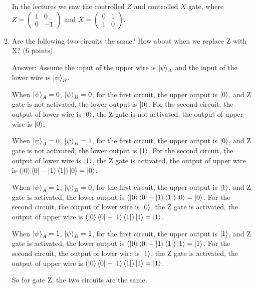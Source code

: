 \documentclass{article}
\begin{document}
\begin{enumerate}
          In the lectures we saw the controlled $Z$ and controlled $X$ gate, where $Z = \begin{pmatrix} 1 & 0 \\ 0 & -1 \end{pmatrix}$ and $X = \begin{pmatrix} 0 & 1 \\ 1 & 0 \end{pmatrix}$.
    \item Are the following two circuits the same? How about when we replace Z with X? (6 points)


          Answer:
          Assume the input of the upper wire is $\ket{\psi}_A$ and the input of the lower wire is $\ket{\psi}_B$.

          When $\ket{\psi}_A=0$, $\ket{\psi}_B=0$, for the first circuit, the upper output is $\ket{0}$, and Z gate is not activated, the lower output is $\ket{0}$. For the second circuit, the output of lower wire is $\ket{0}$, the Z gate is not activated, the output of upper wire is $\ket{0}$.

          When $\ket{\psi}_A=0$, $\ket{\psi}_B=1$, for the first circuit, the upper output is $\ket{0}$, and Z gate is not activated, the lower output is $\ket{1}$. For the second circuit, the output of lower wire is $\ket{1}$, the Z gate is activated, the output of upper wire is $(\ket{0}\bra{0}-\ket{1}\bra{1})\ket{0}=\ket{0}$.

          When $\ket{\psi}_A=1$, $\ket{\psi}_B=0$, for the first circuit, the upper output is $\ket{1}$, and Z gate is activated, the lower output is $(\ket{0}\bra{0}-\ket{1}\bra{1})\ket{0}=\ket{0}$. For the second circuit, the output of lower wire is $\ket{0}$, the Z gate is activated, the output of upper wire is $(\ket{0}\bra{0}-\ket{1}\bra{1})\ket{1}=\ket{1}$.

          When $\ket{\psi}_A=1$, $\ket{\psi}_B=1$, for the first circuit, the upper output is $\ket{1}$, and Z gate is activated, the lower output is $(\ket{0}\bra{0}-\ket{1}\bra{1})\ket{1}=\ket{1}$. For the second circuit, the output of lower wire is $\ket{1}$, the Z gate is activated, the output of upper wire is $(\ket{0}\bra{0}-\ket{1}\bra{1})\ket{1}=\ket{1}$.

          So for gate Z, the two circuits are the same.


\end{enumerate}
\end{document}
